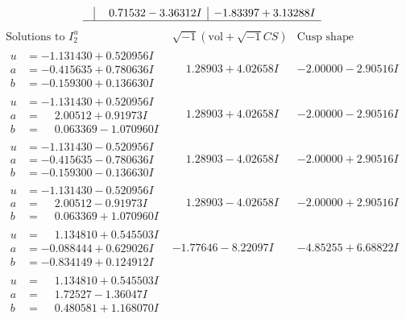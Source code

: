 \documentclass[1p]{elsarticle_modified}
\theoremstyle{definition}
\newcommand{\I}{\sqrt{-1}}
\begin{document}
$$\begin{array}{c|c|c}
 & \phantom{-}0.71532 - 3.36312 I & -1.83397 + 3.13288 I\\
 \hline 
 \end{array}$$\newpage$$\begin{array}{c|c|c}  
\text{Solutions to }I^u_{2}& \I (\text{vol} + \sqrt{-1}CS) & \text{Cusp shape}\\
 \hline 
\begin{aligned}
u &= -1.131430 + 0.520956 I \\
a &= -0.415635 + 0.780636 I \\
b &= -0.159300 + 0.136630 I\end{aligned}
 & \phantom{-}1.28903 + 4.02658 I & -2.00000 - 2.90516 I \\ \hline\begin{aligned}
u &= -1.131430 + 0.520956 I \\
a &= \phantom{-}2.00512 + 0.91973 I \\
b &= \phantom{-}0.063369 - 1.070960 I\end{aligned}
 & \phantom{-}1.28903 + 4.02658 I & -2.00000 - 2.90516 I \\ \hline\begin{aligned}
u &= -1.131430 - 0.520956 I \\
a &= -0.415635 - 0.780636 I \\
b &= -0.159300 - 0.136630 I\end{aligned}
 & \phantom{-}1.28903 - 4.02658 I & -2.00000 + 2.90516 I \\ \hline\begin{aligned}
u &= -1.131430 - 0.520956 I \\
a &= \phantom{-}2.00512 - 0.91973 I \\
b &= \phantom{-}0.063369 + 1.070960 I\end{aligned}
 & \phantom{-}1.28903 - 4.02658 I & -2.00000 + 2.90516 I \\ \hline\begin{aligned}
u &= \phantom{-}1.134810 + 0.545503 I \\
a &= -0.088444 + 0.629026 I \\
b &= -0.834149 + 0.124912 I\end{aligned}
 & -1.77646 - 8.22097 I & -4.85255 + 6.68822 I \\ \hline\begin{aligned}
u &= \phantom{-}1.134810 + 0.545503 I \\
a &= \phantom{-}1.72527 - 1.36047 I \\
b &= \phantom{-}0.480581 + 1.168070 I\end{aligned}

\end{array}$$
\end{document}
